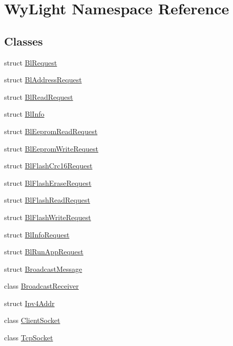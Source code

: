 \hypertarget{namespace_wy_light}{\section{Wy\-Light Namespace Reference}
\label{namespace_wy_light}
}
\subsection*{Classes}
\begin{DoxyCompactItemize}
\item 
struct \hyperlink{struct_wy_light_1_1_bl_request}{Bl\-Request}
\item 
struct \hyperlink{struct_wy_light_1_1_bl_address_request}{Bl\-Address\-Request}
\item 
struct \hyperlink{struct_wy_light_1_1_bl_read_request}{Bl\-Read\-Request}
\item 
struct \hyperlink{struct_wy_light_1_1_bl_info}{Bl\-Info}
\item 
struct \hyperlink{struct_wy_light_1_1_bl_eeprom_read_request}{Bl\-Eeprom\-Read\-Request}
\item 
struct \hyperlink{struct_wy_light_1_1_bl_eeprom_write_request}{Bl\-Eeprom\-Write\-Request}
\item 
struct \hyperlink{struct_wy_light_1_1_bl_flash_crc16_request}{Bl\-Flash\-Crc16\-Request}
\item 
struct \hyperlink{struct_wy_light_1_1_bl_flash_erase_request}{Bl\-Flash\-Erase\-Request}
\item 
struct \hyperlink{struct_wy_light_1_1_bl_flash_read_request}{Bl\-Flash\-Read\-Request}
\item 
struct \hyperlink{struct_wy_light_1_1_bl_flash_write_request}{Bl\-Flash\-Write\-Request}
\item 
struct \hyperlink{struct_wy_light_1_1_bl_info_request}{Bl\-Info\-Request}
\item 
struct \hyperlink{struct_wy_light_1_1_bl_run_app_request}{Bl\-Run\-App\-Request}
\item 
struct \hyperlink{struct_wy_light_1_1_broadcast_message}{Broadcast\-Message}
\item 
class \hyperlink{class_wy_light_1_1_broadcast_receiver}{Broadcast\-Receiver}
\item 
struct \hyperlink{struct_wy_light_1_1_ipv4_addr}{Ipv4\-Addr}
\item 
class \hyperlink{class_wy_light_1_1_client_socket}{Client\-Socket}
\item 
class \hyperlink{class_wy_light_1_1_tcp_socket}{Tcp\-Socket}

\end{DoxyCompactItemize}
